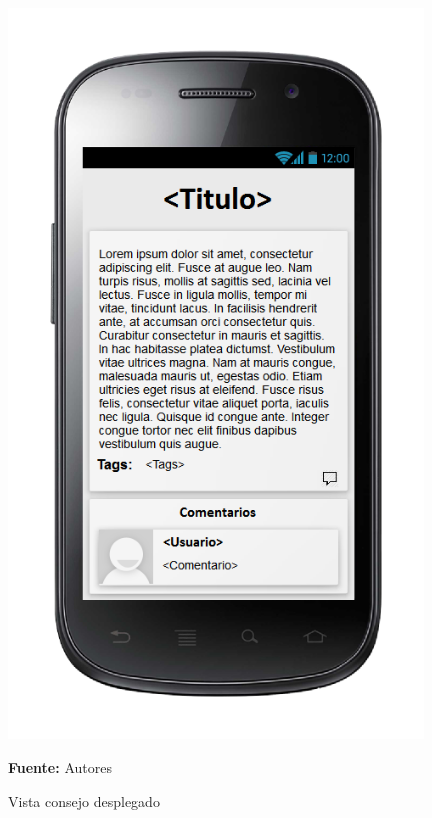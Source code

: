 \begin{figure}[!htb]
  \begin{center}
\includegraphics[width=11cm]{./imagenes/UI/Contenidos/consejo_desplegado.png}
    \caption{Vista consejo desplegado}
    \label{fig:Vista_consejo_desplegado}
    \textbf{Fuente:}  Autores
  \end{center}
\end{figure}
